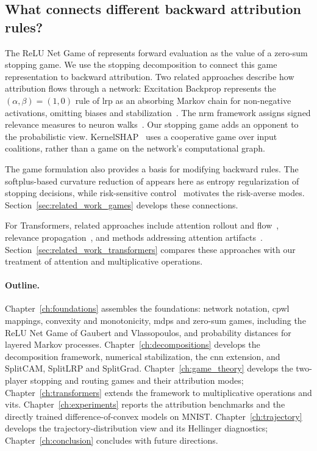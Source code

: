 \subsection{What connects different backward attribution rules?}
The ReLU Net Game of \textcite{Gaubert2025} represents forward evaluation as the value of a zero-sum stopping game. We use the stopping decomposition to connect this game representation to backward attribution. Two related approaches describe how attribution flows through a network: Excitation Backprop represents the $(\alpha,\beta)=(1,0)$ rule of \ac{lrp} as an absorbing Markov chain for non-negative activations, omitting biases and stabilization~\parencite{Zhang2018pointinggame}. The \ac{nrm} framework assigns signed relevance measures to neuron walks~\parencite{Xiong2026nrm}. Our stopping game adds an opponent to the probabilistic view. KernelSHAP~\parencite{LundbergLee2017} uses a cooperative game over input coalitions, rather than a game on the network's computational graph.

The game formulation also provides a basis for modifying backward rules. The softplus-based curvature reduction of \textcite{Dombrowski2020} appears here as entropy regularization of stopping decisions, while risk-sensitive control~\parencite{zhang2021risk} motivates the risk-averse modes. Section~\ref{sec:related_work_games} develops these connections.

For Transformers, related approaches include attention rollout and flow~\parencite{Abnar2020attention}, relevance propagation~\parencite{Chefer2021ICCV,Chefer2021GenericAttention,Ali2022AttnLRP,Achtibat2024AttnLRP}, and methods addressing attention artifacts~\parencite{Wrobel2024,darcet2024vision}. Section~\ref{sec:related_work_transformers} compares these approaches with our treatment of attention and multiplicative operations.

\paragraph{Outline.}
Chapter~\ref{ch:foundations} assembles the foundations: network notation, \ac{cpwl} mappings, convexity and monotonicity, \acp{mdp} and zero-sum games, including the ReLU Net Game of Gaubert and Vlassopoulos, and probability distances for layered Markov processes. Chapter~\ref{ch:decompositions} develops the decomposition framework, numerical stabilization, the \ac{cnn} extension, and SplitCAM, SplitLRP and SplitGrad. Chapter~\ref{ch:game_theory} develops the two-player stopping and routing games and their attribution modes; Chapter~\ref{ch:transformers} extends the framework to multiplicative operations and \acp{vit}. Chapter~\ref{ch:experiments} reports the attribution benchmarks and the directly trained difference-of-convex models on MNIST. Chapter~\ref{ch:trajectory} develops the trajectory-distribution view and its Hellinger diagnostics; Chapter~\ref{ch:conclusion} concludes with future directions.
